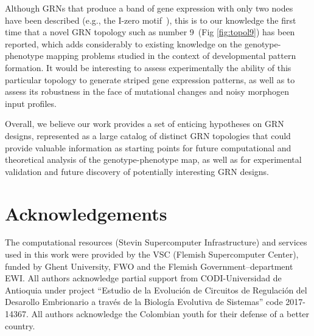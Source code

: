 \documentclass[10pt,letterpaper]{article}
\begin{document}
Although GRNs that produce a band of gene expression with only two nodes have
been described (e.g., the I-zero motif~\cite{Schaerli2014}), this is to our
knowledge the first time that a novel GRN topology such as number
9~(Fig \ref{fig:topol9}) has been reported, which adds considerably to existing
knowledge on the genotype-phenotype mapping problems studied in the
context of developmental pattern formation. It would be interesting to assess
experimentally the ability of this particular topology to generate striped gene
expression patterns, as well as to assess its robustness in the face of mutational
changes and noisy morphogen input profiles.

Overall, we believe our work provides a set of enticing hypotheses on GRN designs,
represented as a large catalog of distinct GRN topologies that could provide
valuable information as starting points for future computational and theoretical
analysis of the genotype-phenotype map, as well as for experimental validation and
future discovery of potentially interesting GRN designs.

\section*{Acknowledgements}
The computational resources (Stevin Supercomputer Infrastructure) and
services used in this work were provided by the VSC (Flemish Supercomputer
Center), funded by Ghent University, FWO and the Flemish Government–department EWI.
All authors acknowledge partial support from CODI-Universidad de Antioquia under
project ``Estudio de la Evolución de Circuitos de Regulación del Desarollo
Embrionario a través de la Biología Evolutiva de Sistemas'' code 2017-14367. All
authors acknowledge the Colombian youth for their defense of a better country.

\nolinenumbers
\end{document}
